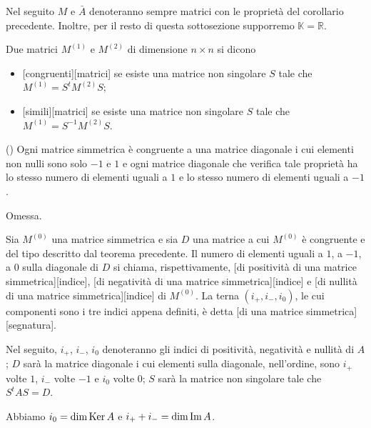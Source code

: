 	\par Nel seguito $M$ e $\bar{A}$ denoteranno sempre matrici con le propriet\`a del corollario precedente. Inoltre, per il resto di questa sottosezione supporremo $\mathbb{K} = \mathbb{R}$.
\begin{Definition}\label{def43}
	Due matrici $M^{(1)}$ e $M^{(2)}$ di dimensione $n \times n$ si dicono
		\begin{itemize}
			\item {}[congruenti][matrici] se esiste una matrice non singolare $S$ tale che $M^{(1)} = S^tM^{(2)}S$;
			\item {}[simili][matrici] se esiste una matrice non singolare $S$ tale che $M^{(1)} = S^{-1}M^{(2)}S$.
		\end{itemize}
\end{Definition}
\begin{Theorem}\label{th50}
	() Ogni matrice simmetrica \`e congruente a una matrice diagonale i cui elementi non nulli sono solo $-1$ e $1$ e ogni matrice diagonale che verifica tale propriet\`a ha lo stesso numero di elementi uguali a $1$ e lo stesso numero di elementi uguali a $-1$.
\end{Theorem}
\Proof Omessa. \EndProof
\begin{Definition}\label{def44}
	Sia $M^{(0)}$ una matrice simmetrica e sia $D$ una matrice a cui $M^{(0)}$ \`e congruente e del tipo descritto dal teorema precedente. Il numero di elementi uguali a $1$, a $-1$, a $0$ sulla diagonale di $D$ si chiama, rispettivamente, [di positivit\`a di una matrice simmetrica][indice], [di negativit\`a di una matrice simmetrica][indice] e [di nullit\`a di una matrice simmetrica][indice] di $M^{(0)}$. La terna $(i_+, i_-, i_0)$, le cui componenti sono i tre indici appena definiti, \`e detta [di una matrice simmetrica][segnatura].
\end{Definition}
	\par Nel seguito, $i_+$, $i_-$, $i_0$ denoteranno gli indici di positivit\`a, negativit\`a e nullit\`a di $A$; $D$ sar\`a la matrice diagonale i cui elementi sulla diagonale, nell'ordine, sono $i_+$ volte $1$, $i_-$ volte $-1$ e $i_0$ volte $0$; $S$ sar\`a la matrice non singolare tale che $S^{t}AS = D$.
\begin{Theorem}\label{th51}
	Abbiamo $i_0 = \dim \operatorname{Ker} A$ e $i_+ + i_- = \dim \operatorname{Im} A$.
\end{Theorem}

